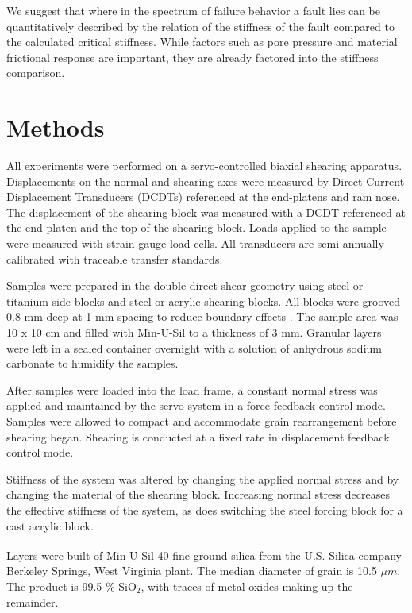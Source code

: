 \documentclass[11pt]{article}
\begin{document}
We suggest that where in the spectrum of failure behavior a fault lies can be
quantitatively described by the relation of the stiffness of the fault compared
to the calculated critical stiffness. While factors such as pore pressure and
material frictional response are important, they are already factored into  the
stiffness comparison.

\section{Methods}
All experiments were performed on a servo-controlled biaxial shearing apparatus.
Displacements on the normal and shearing axes were measured by Direct Current
Displacement Transducers (DCDTs) referenced at the end-platens and ram nose. The
displacement of the shearing block was measured with a DCDT referenced at the
end-platen and the top of the shearing block. Loads applied to the sample were
measured with strain gauge load cells. All transducers are semi-annually
calibrated with traceable transfer standards.

Samples were prepared in the double-direct-shear geometry using steel or
titanium side blocks and steel or acrylic shearing blocks. All blocks were
grooved 0.8 mm deep at 1 mm spacing to reduce boundary effects \cite{Anthony:2005}. The sample area
was 10 x 10 cm and filled with Min-U-Sil to a thickness of 3 mm. Granular layers
were left in a sealed container overnight with a solution of anhydrous sodium
carbonate to humidify the samples.

After samples were loaded into the load frame, a constant normal stress was
applied and maintained by the servo system in a force feedback control mode.
Samples were allowed to compact and accommodate grain rearrangement before
shearing began. Shearing is conducted at a fixed rate in displacement feedback
control mode.

Stiffness of the system was altered by changing the applied normal stress and by
changing the material of the shearing block. Increasing normal stress decreases
the effective stiffness of the system, as does switching the steel forcing block
for a cast acrylic block.

Layers were built of Min-U-Sil\textsuperscript{\textregistered} 40 fine ground
silica from the U.S. Silica\textsuperscript{\textregistered} company Berkeley
Springs, West Virginia plant. The median diameter of grain is 10.5 $\mu m$. The
product is 99.5 \% SiO$_2$, with traces of metal oxides making up the remainder.
\end{document}
